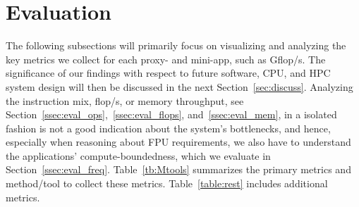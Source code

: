\section{Evaluation}\label{sec:eval}
%
The following subsections will primarily focus on visualizing and analyzing the key metrics we collect for each proxy- and mini-app,
such as \unit[]{Gflop/s}. The significance of our findings with respect to future software, CPU, and HPC system design will then
be discussed in the next Section~\ref{sec:discuss}.
Analyzing the instruction mix, \unit[]{flop/s}, or memory throughput,
see Section~\ref{ssec:eval_ops},~\ref{ssec:eval_flops}, and~\ref{ssec:eval_mem},
in a isolated fashion is not a good indication about the system's bottlenecks,
and hence, especially when reasoning about FPU requirements, we also have to understand
the applications' compute-boundedness, which we evaluate in Section~\ref{ssec:eval_freq}.
Table~\ref{tb:Mtools} summarizes the primary metrics and method/tool to collect these metrics. Table~\ref{table:rest} includes additional metrics. 
%

